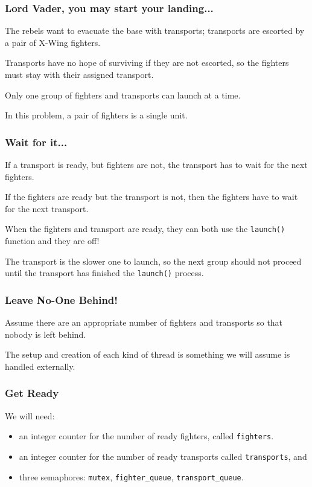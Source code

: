 \begin{frame}
\frametitle{Lord Vader, you may start your landing...}

The rebels want to evacuate the base with transports; transports are escorted by a pair of X-Wing fighters. 

Transports have no hope of surviving if they are not escorted, so the fighters must stay with their assigned transport. 

Only one group of fighters and transports can launch at a time. 

In this problem,  a pair of fighters is a single unit.

\end{frame}


\begin{frame}
\frametitle{Wait for it...}

If a transport is ready, but fighters are not, the transport has to wait for the next fighters. 

If the fighters are ready but the transport is not, then the fighters have to wait for the next transport. 

When the fighters and transport are ready, they can both use the \texttt{launch()} function and they are off! 

The transport is the slower one to launch, so the next group should not proceed until the transport has finished the \texttt{launch()} process.


\end{frame}


\begin{frame}
\frametitle{Leave No-One Behind!}


Assume there are an appropriate number of fighters and transports so that nobody is left behind. 

The setup and creation of each kind of thread is something we will assume is handled externally.

\end{frame}


\begin{frame}
\frametitle{Get Ready}

We will need:

\begin{itemize}
\item an integer counter for the number of ready fighters, called \texttt{fighters}.

\item an integer counter for the number of ready transports called \texttt{transports}, and 
\item three semaphores: \texttt{mutex}, \texttt{fighter\_queue}, \texttt{transport\_queue}.
\end{itemize}


\end{frame}


